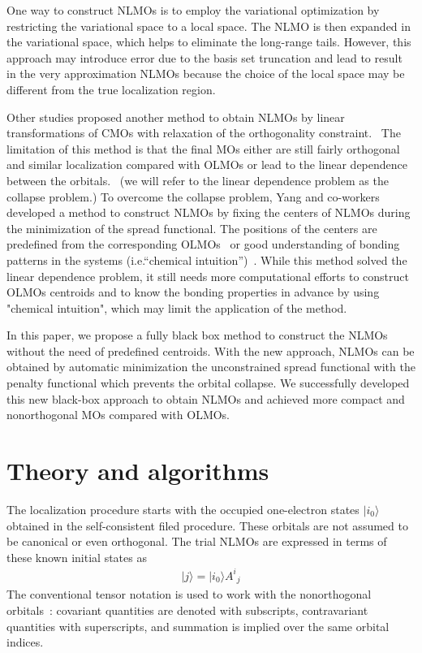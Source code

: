 \documentclass[aps,prl,reprint,amsmath,amssymb]{revtex4-1}
\newcommand{\ket}[1]{\ensuremath{\vert #1 \rangle}}
\begin{document}
One way to construct NLMOs is to employ the variational optimization by restricting the variational space to a local space.
The NLMO is then expanded in the variational space, which helps to eliminate the long-range tails.
However, this approach may introduce error due to the basis set truncation and lead to result in the very approximation NLMOs because the choice of the local space may be different from the true localization region.

Other studies proposed another method to obtain NLMOs by linear transformations of CMOs with relaxation of the orthogonality constraint.~\cite{feng2004An_efficient, cui2010efficient} 
The limitation of this method is that the final MOs either are still fairly orthogonal and similar localization compared with OLMOs or lead to the linear dependence between the orbitals.~\cite{feng2004An_efficient} (we will refer to the linear dependence problem as the collapse problem.)
To overcome the collapse problem, Yang and co-workers~\cite{feng2004An_efficient, cui2010efficient}  developed a method to construct NLMOs by fixing the centers of NLMOs during the minimization of the spread functional. 
The positions of the centers are predefined from the corresponding OLMOs~\cite{feng2004An_efficient} or good understanding of bonding patterns in the systems (i.e.``chemical intuition'')~\cite{cui2010efficient}.
While this method solved the linear dependence problem, it still needs more computational efforts to construct OLMOs centroids and to know the bonding properties in advance by using "chemical intuition", which may limit the application of the method.

In this paper, we propose a fully black box method to construct the NLMOs without the need of predefined centroids.
With the new approach, NLMOs can be obtained by automatic minimization the unconstrained spread functional with the  penalty functional which prevents the orbital collapse.
We successfully developed this new black-box approach to obtain NLMOs and achieved more compact and nonorthogonal MOs compared with OLMOs.

\section{Theory and algorithms}

The localization procedure starts with the occupied one-electron states $\ket{i_0}$ obtained in the self-consistent filed procedure. These orbitals are not assumed to be canonical or even orthogonal. The trial NLMOs are expressed in terms of these known initial states as
%
\begin{equation}
\begin{split}
\ket{j} = \ket{i_0} {A^i}_j  
\end{split}
\end{equation}
%
The conventional tensor notation is used to work with the nonorthogonal orbitals~\cite{head1998tensor}: covariant quantities are denoted with subscripts, contravariant quantities with superscripts, and summation is implied over the same orbital indices.
\end{document}
